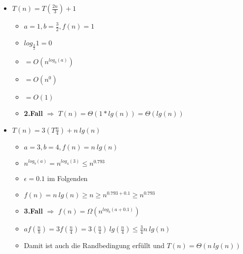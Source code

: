 \begin{itemize}
\begin{itemize}
\begin{itemize}
                        \item $T(n) = T(\frac{2n}{3}) + 1$
                            \begin{itemize}
                                \item $a=1, b= \frac{3}{2}, f(n) = 1$
                                \item $log_{\frac{3}{2}} 1 = 0$
                                \item {} $= O(n^{log_b(a)})$
                                \item[] {\makebox[1.5cm][l]{}} $= O(n^0)$
                                \item[] {\makebox[1.5cm][l]{}} $= O(1)$
                                \item \textbf{2.Fall} $\Rightarrow$ $T(n) = \Theta(1 * lg(n)) = \Theta(lg(n))$   
                            \end{itemize}

                        \item $T(n) = 3(T\frac{n}{4}) + n~lg(n)$
                            \begin{itemize}
                                \item $a=3,b=4,f(n)= n~lg(n)$
                                \item $n^{log_b(a)} = n^{log_4(3)} \leq n^{0.793}$
                                \item $\epsilon = 0.1$ im Folgenden
                                \item $f(n) = n~lg(n) \geq n \geq n^{0.793 + 0.1} \geq n^{0.793}$ 
                                \item \textbf{3.Fall} $\Rightarrow$ $f(n) = \Omega(n^{log_b(a+0.1)})$
                                \item $a f(\frac{n}{b}) = 3f(\frac{n}{4}) = 3(\frac{n}{4})~lg(\frac{n}{4}) \leq \frac{3}{4} n~lg(n)$
                                \item Damit ist auch die Randbedingung erfüllt und $T(n) = \Theta(n~lg(n))$
                                
                            \end{itemize}
                    \end{itemize}
            \end{itemize}

    \end{itemize}

\pagebreak

